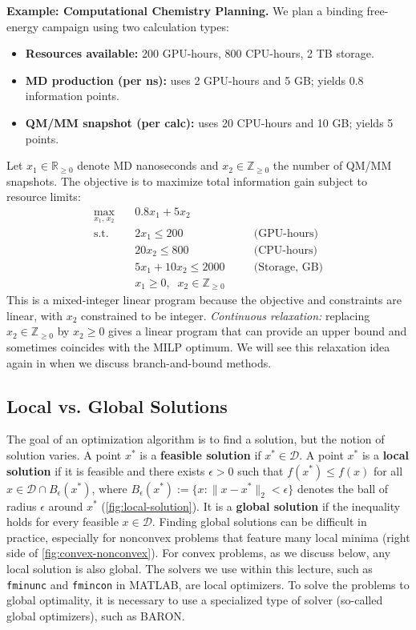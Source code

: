 \begin{exampleBox}
    \textbf{Example: Computational Chemistry Planning.}
    We plan a binding free-energy campaign using two calculation types:
    \begin{itemize}
      \item \textbf{Resources available:} 200 GPU-hours, 800 CPU-hours, 2 TB storage.
      \item \textbf{MD production (per ns):} uses 2 GPU-hours and 5 GB; yields 0.8 information points.
      \item \textbf{QM/MM snapshot (per calc):} uses 20 CPU-hours and 10 GB; yields 5 points.
    \end{itemize}
    Let $x_1 \in \mathbb{R}_{\ge 0}$ denote MD nanoseconds and $x_2 \in \mathbb{Z}_{\ge 0}$ the number of QM/MM snapshots. 
    The objective is to maximize total information gain subject to resource limits:
    \[
    \begin{aligned}
    \max_{x_1,\,x_2}\quad & 0.8x_1 + 5x_2\\[2pt]
    \text{s.t.}\quad 
      & 2x_1 \le 200 \quad &&\text{(GPU-hours)}\\
      & 20x_2 \le 800 \quad &&\text{(CPU-hours)}\\
      & 5x_1 + 10x_2 \le 2000 \quad &&\text{(Storage, GB)}\\
      & x_1 \ge 0,\;\; x_2 \in \mathbb{Z}_{\ge 0}
    \end{aligned}
    \]
    This is a mixed-integer linear program because the objective and constraints are linear, with $x_2$ constrained to be integer.
    \emph{Continuous relaxation:} replacing $x_2 \in \mathbb{Z}_{\ge 0}$ by $x_2 \ge 0$ gives a linear program that can provide an upper bound and sometimes coincides with the MILP optimum. We will see this relaxation idea again in  when we discuss branch-and-bound methods.
\end{exampleBox}


\subsection{Local vs. Global Solutions}
The goal of an optimization algorithm is to find a solution, but the notion of solution varies. A point $x^*$ is a \textbf{feasible solution} if $x^* \in \mathcal{D}$. A point $x^*$ is a \textbf{local solution} if it is feasible and there exists $\epsilon>0$ such that $f(x^*) \le f(x)$ for all $x \in \mathcal{D} \cap B_{\epsilon}(x^*)$, where $B_\epsilon(x^*) := \{x : \|x-x^*\|_2 < \epsilon\}$ denotes the ball of radius $\epsilon$ around $x^*$ (\autoref{fig:local-solution}). It is a \textbf{global solution} if the inequality holds for every feasible $x \in \mathcal{D}$. Finding global solutions can be difficult in practice, especially for nonconvex problems that feature many local minima (right side of \autoref{fig:convex-nonconvex}). For convex problems, as we discuss below, any local solution is also global. The solvers we use within this lecture, such as \texttt{fminunc} and \texttt{fmincon} in MATLAB, are local optimizers. To solve the problems to global optimality, it is necessary to use a specialized type of solver (so-called global optimizers), such as BARON.

